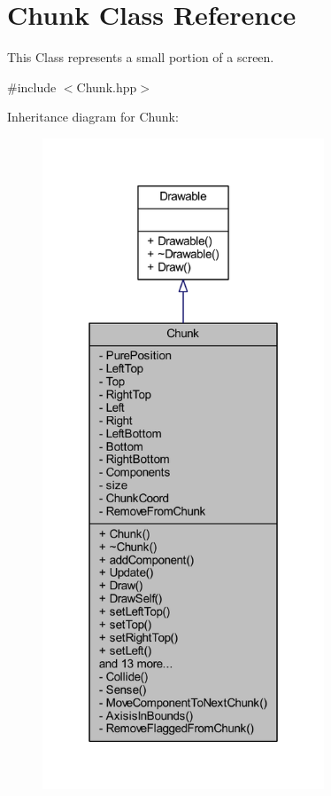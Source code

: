 \hypertarget{class_chunk}{\section{Chunk Class Reference}
\label{class_chunk}
}


This Class represents a small portion of a screen.  




{\ttfamily \#include $<$Chunk.\-hpp$>$}



Inheritance diagram for Chunk\-:\nopagebreak
\begin{figure}[H]
\begin{center}
\leavevmode
\includegraphics[height=550pt]{class_chunk__inherit__graph}
\end{center}
\end{figure}


